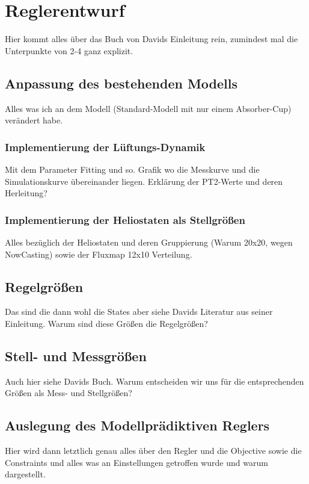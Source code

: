 \chapter{Reglerentwurf} \label{ch_Reglerentwurf}
Hier kommt alles über das Buch von Davids Einleitung rein, zumindest mal die Unterpunkte von 2-4 ganz explizit.

\section{Anpassung des bestehenden Modells} \label{sec_AnpassungModell}
Alles was ich an dem Modell (Standard-Modell mit nur einem Absorber-Cup) verändert habe.

\subsection{Implementierung der Lüftungs-Dynamik} \label{subsec_ImplementierungFan}
Mit dem Parameter Fitting und so.
Grafik wo die Messkurve und die Simulationskurve übereinander liegen.
Erklärung der PT2-Werte und deren Herleitung?

\subsection{Implementierung der Heliostaten als Stellgrößen} \label{subsec_ImplementierungHeliostate}
Alles bezüglich der Heliostaten und deren Gruppierung (Warum 20x20, wegen NowCasting) sowie der Fluxmap 12x10 Verteilung.

\section{Regelgrößen} \label{sec_Regelgrößen}
Das sind die dann wohl die States aber siehe Davids Literatur aus seiner Einleitung.
Warum sind diese Größen die Regelgrößen?

\section{Stell- und Messgrößen} \label{sec_StellMessgrößen}
Auch hier siehe Davids Buch.
Warum entscheiden wir uns für die entsprechenden Größen als Mess- und Stellgrößen?

\section{Auslegung des Modellprädiktiven Reglers} \label{sec_AuslegungMPC}
Hier wird dann letztlich genau alles über den Regler und die Objective sowie die Constraints und alles was an Einstellungen getroffen wurde und warum dargestellt.
